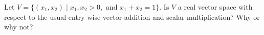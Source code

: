 \documentclass[10pt]{article}
\newcommand{\noin}{\noindent}
\begin{document}
\vspace{0.2in}
{\large 
{} 

\vspace{0.2in}


}

\vfill


\pagebreak


\noin{\bf 1.}  Let $V=\{ (x_1, x_2) \mid  x_1, x_2>0, \mbox{ and } x_1+x_2=1\}$.  Is $V$ a real vector space with respect to the usual entry-wise vector addition and scalar multiplication?  Why or why not?


\end{document}
